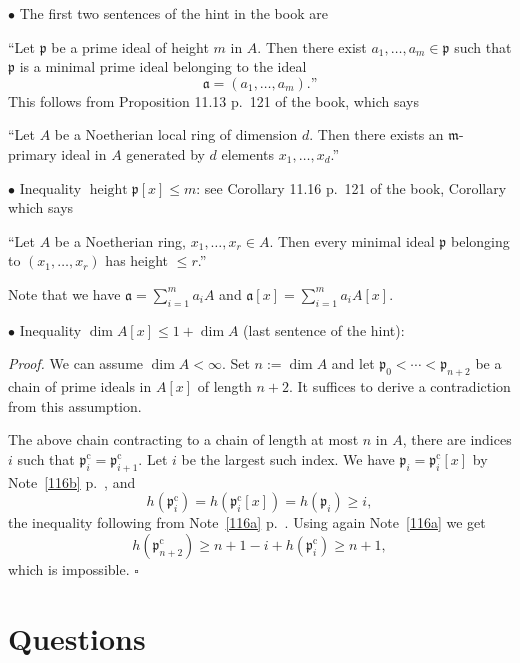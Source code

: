 \documentclass[parskip=half,fontsize=12pt]{scrartcl}%
\newcommand{\oo}{\operatorname}\newcommand{\ooo}{\operatorname*}
\newcommand{\mf}{\mathfrak}
\newcommand{\aaa}{\mf a}
\newcommand{\mmm}{\mf m}
\newcommand{\ppp}{\mf p}
\begin{document}
$\bullet$ The first two sentences of the hint in the book are 

``Let $\ppp$ be a prime ideal of height $m$ in $A$. Then there exist $a_1,\ldots,a_m\in\ppp$ such that $\ppp$ is a minimal prime ideal belonging to the ideal 
$$
\aaa=(a_1,\ldots,a_m).\text{''}
$$ 
This follows from Proposition 11.13 p.~121 of the book, which says 

``Let $A$ be a Noetherian local ring of dimension $d$. Then there exists an $\mmm$-primary ideal in $A$ generated by $d$ elements $x_1,\ldots,x_d$.'' %

$\bullet$ Inequality $\oo{height }\ppp[x]\le m$: see Corollary 11.16 p.~121 of the book, Corollary which says 

``Let $A$ be a Noetherian ring, $x_1,\ldots,x_r\in A$. Then every minimal ideal $\ppp$ belonging to $(x_1,\ldots,x_r)$ has height $\le r$.''

Note that we have $\aaa=\sum_{i=1}^ma_iA$ and $\aaa[x]=\sum_{i=1}^ma_iA[x]$. 

$\bullet$ Inequality $\dim A[x]\le1+\dim A$ (last sentence of the hint): 


\emph{Proof.} We can assume $\dim A<\infty$. Set $n:=\dim A$ and let 
$ 
\ppp_0<\cdots<\ppp_{n+2}
$ 
be a chain of prime ideals in $A[x]$ of length $n+2$. It suffices to derive a contradiction from this assumption. 

The above chain contracting to a chain of length at most $n$ in $A$, there are indices $i$ such that $\ppp_i^{\oo c}=\ppp_{i+1}^{\oo c}$. Let $i$ be the largest such index. We have $\ppp_i=\ppp_i^{\oo c}[x]$ by Note~\ref{116b} p.~\pageref{116b}, and 
$$
h(\ppp_i^{\oo c})=h(\ppp_i^{\oo c}[x])=h(\ppp_i)\ge i,
$$ 
the inequality following from Note~\ref{116a} p.~\pageref{116a}. Using again Note~\ref{116a} we get  %
$$
h(\ppp_{n+2}^{\oo c})\ge n+1-i+h(\ppp_i^{\oo c})\ge n+1,
$$ 
which is impossible. $\square$

\section{Questions}%
\end{document}
